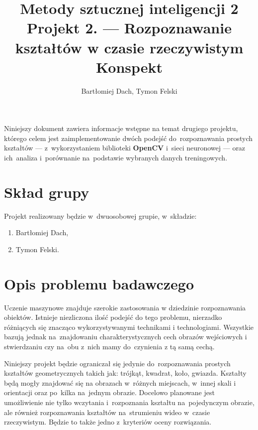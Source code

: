 \documentclass[11pt,a4paper]{article}
\begin{document}
\title{Metody sztucznej inteligencji 2 \\
\Large{
    Projekt 2. --- Rozpoznawanie kształtów w czasie rzeczywistym \\
    Konspekt
}}
\author{Bartłomiej Dach, Tymon Felski}
\maketitle

\noindent
Niniejszy dokument zawiera informacje wstępne na temat drugiego projektu, którego celem jest zaimplementowanie dwóch podejść do~rozpoznawania prostych kształtów --- z~wykorzystaniem biblioteki \textbf{OpenCV} i~sieci neuronowej --- oraz ich~analiza i~porównanie na~podstawie wybranych danych treningowych.

\section{Skład grupy}

Projekt realizowany będzie w~dwuosobowej grupie, w~składzie:
\begin{enumerate}
    \setlength\itemsep{-.4em}
    \item Bartłomiej Dach,
    \item Tymon Felski.
\end{enumerate}

\section{Opis problemu badawczego}

Uczenie maszynowe znajduje szerokie zastosowania w dziedzinie rozpoznawania obiektów. Istnieje niezliczona ilość podejść do tego problemu, nierzadko różniących się znacząco wykorzystywanymi technikami i technologiami. Wszystkie bazują jednak na~znajdowaniu charakterystycznych cech obrazów wejściowych i stwierdzaniu czy na~obu z~nich mamy do~czynienia z tą samą cechą.

Niniejszy projekt będzie ograniczał się jedynie do~rozpoznawania prostych kształtów geometrycznych takich jak: trójkąt, kwadrat, koło, gwiazda. Kształty będą mogły znajdować się na obrazach w~różnych miejscach, w~innej skali i orientacji oraz po~kilka na~jednym obrazie. Docelowo planowane jest umożliwienie nie tylko wczytania i~rozpoznania kształtu na~pojedynczym obrazie, ale również rozpoznawania kształtów na~strumieniu wideo w~czasie rzeczywistym. Będzie to także jedno z~kryteriów oceny rozwiązania.
\end{document}
